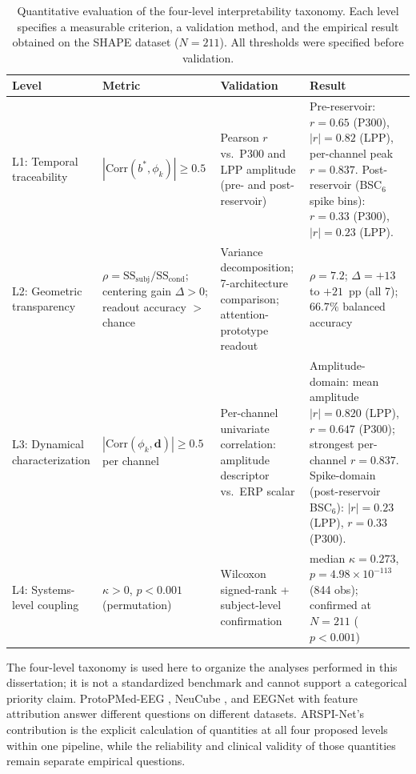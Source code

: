 \begin{table}[t]
\centering
\caption{Quantitative evaluation of the four-level interpretability taxonomy. Each level specifies a measurable criterion, a validation method, and the empirical result obtained on the SHAPE dataset ($N = 211$). All thresholds were specified before validation.}
\label{tab:taxonomy_metrics}
\small
\begin{tabular}{p{2.5cm}p{3.5cm}p{3.5cm}p{3.5cm}}
\toprule
\textbf{Level} & \textbf{Metric} & \textbf{Validation} & \textbf{Result} \\
\midrule
L1: Temporal traceability & $|\text{Corr}(b^*, \phi_k)| \geq 0.5$ & Pearson $r$ vs.\ P300 and LPP amplitude (pre- and post-reservoir) & Pre-reservoir: $r = 0.65$ (P300), $|r| = 0.82$ (LPP), per-channel peak $r = 0.837$. Post-reservoir (BSC$_6$ spike bins): $r = 0.33$ (P300), $|r| = 0.23$ (LPP). \\
\midrule
L2: Geometric transparency & $\rho = \text{SS}_\text{subj} / \text{SS}_\text{cond}$; centering gain $\Delta > 0$; readout accuracy $>$ chance & Variance decomposition; 7-architecture comparison; attention-prototype readout & $\rho = 7.2$; $\Delta = +13$ to $+21$~pp (all 7); $66.7\%$ balanced accuracy \\
\midrule
L3: Dynamical characterization & $|\text{Corr}(\phi_k, \mathbf{d})| \geq 0.5$ per channel & Per-channel univariate correlation: amplitude descriptor vs.\ ERP scalar & Amplitude-domain: mean amplitude $|r| = 0.820$ (LPP), $r = 0.647$ (P300); strongest per-channel $r = 0.837$. Spike-domain (post-reservoir BSC$_6$): $|r| = 0.23$ (LPP), $r = 0.33$ (P300). \\
\midrule
L4: Systems-level coupling & $\kappa > 0$, $p < 0.001$ (permutation) & Wilcoxon signed-rank + subject-level confirmation & median $\kappa = 0.273$, $p = 4.98 \times 10^{-113}$ (844 obs); confirmed at $N = 211$ ($p < 0.001$) \\
\bottomrule
\end{tabular}
\end{table}

The four-level taxonomy is used here to organize the analyses performed in this dissertation; it is not a standardized benchmark and cannot support a categorical priority claim. ProtoPMed-EEG \cite{barnett_protopmed_2024}, NeuCube \cite{kasabov_neucube_2014}, and EEGNet with feature attribution answer different questions on different datasets. ARSPI-Net's contribution is the explicit calculation of quantities at all four proposed levels within one pipeline, while the reliability and clinical validity of those quantities remain separate empirical questions.


